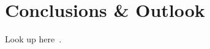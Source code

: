 \documentclass[../main.tex]{subfiles}
\begin{document}
\chapter{Conclusions \& Outlook}\label{ch:concl}

\lipsum[1-4]
Look up here~\cite{Zorin:22}.


\end{document}
